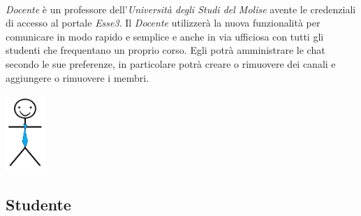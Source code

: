 \paragraph{} 
\textit{Docente} è un professore dell’\textit{Università degli Studi del Molise} avente le credenziali di accesso al portale \textit{Esse3}. Il \textit{Docente} utilizzerà la nuova funzionalità per comunicare in modo rapido e semplice e anche in via ufficiosa con tutti gli studenti che frequentano un proprio corso. Egli potrà amministrare le chat secondo le sue preferenze, in particolare potrà creare o rimuovere dei canali e aggiungere o rimuovere i membri.
\begin{center}
	\includegraphics[width=0.6in]{imgs/attori/Docente.png}
\end{center}

\subsection{Studente}
